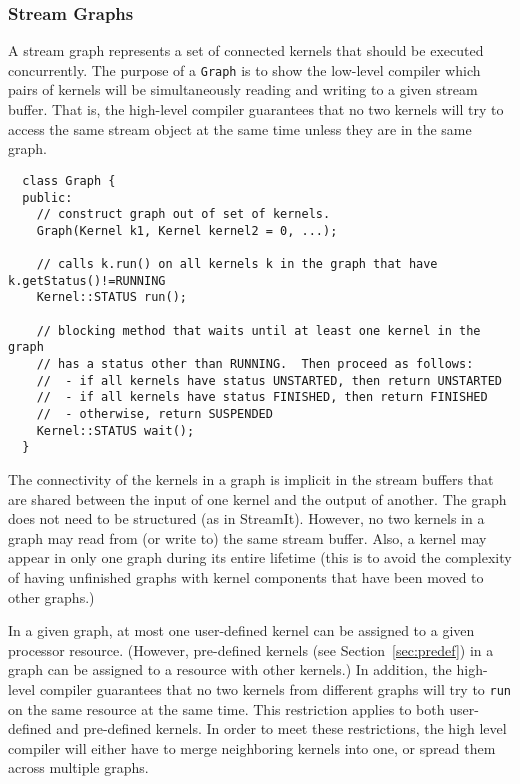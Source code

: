 \subsubsection{Stream Graphs}
\label{sec:streamgraph}

A stream graph represents a set of connected kernels that should be
executed concurrently.  The purpose of a {\tt Graph} is to show the
low-level compiler which pairs of kernels will be simultaneously
reading and writing to a given stream buffer.  That is, the high-level
compiler guarantees that no two kernels will try to access the same
stream object at the same time unless they are in the same graph.
{\small
\begin{verbatim}
  class Graph {
  public:
    // construct graph out of set of kernels.
    Graph(Kernel k1, Kernel kernel2 = 0, ...);

    // calls k.run() on all kernels k in the graph that have k.getStatus()!=RUNNING
    Kernel::STATUS run();

    // blocking method that waits until at least one kernel in the graph 
    // has a status other than RUNNING.  Then proceed as follows:
    //  - if all kernels have status UNSTARTED, then return UNSTARTED
    //  - if all kernels have status FINISHED, then return FINISHED
    //  - otherwise, return SUSPENDED
    Kernel::STATUS wait();
  }
\end{verbatim}}
\noindent The connectivity of the kernels in a graph is implicit in
the stream buffers that are shared between the input of one kernel and
the output of another.  The graph does not need to be structured (as
in StreamIt).  However, no two kernels in a graph may read from (or
write to) the same stream buffer.  Also, a kernel may appear in only
one graph during its entire lifetime (this is to avoid the complexity
of having unfinished graphs with kernel components that have been
moved to other graphs.)

In a given graph, at most one user-defined kernel can be assigned to a
given processor resource.  (However, pre-defined kernels (see
Section~\ref{sec:predef}) in a graph can be assigned to a resource
with other kernels.)  In addition, the high-level compiler guarantees
that no two kernels from different graphs will try to {\tt run} on the
same resource at the same time.  This restriction applies to both
user-defined and pre-defined kernels.  In order to meet these
restrictions, the high level compiler will either have to merge
neighboring kernels into one, or spread them across multiple graphs.

